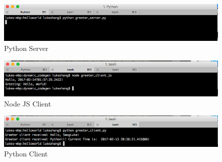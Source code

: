 \documentclass[12pt,letterpaper,boxed]{hmcpset}
\begin{document}
\begin{figure}[H]
  \centering
  \includegraphics[width = 1.0\textwidth]{1.png}
  \caption{Python Server}
\end{figure}
\begin{figure}[H]
  \centering
  \includegraphics[width = 1.0\textwidth]{2.png}
  \caption{Node JS Client}
\end{figure}
\begin{figure}[H]
  \centering
  \includegraphics[width = 1.0\textwidth]{3.png}
  \caption{Python Client}
\end{figure}
\end{document}
